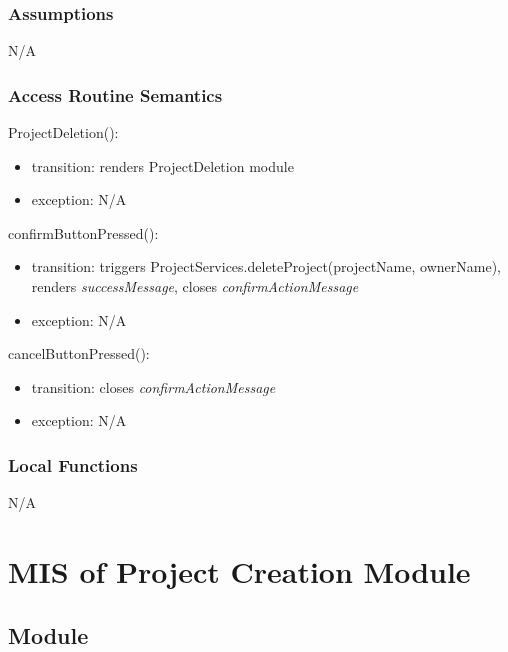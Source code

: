 \documentclass[12pt, titlepage]{article}
\begin{document}
	\subsubsection{Assumptions}
	N/A
	
	\subsubsection{Access Routine Semantics}
	
	\noindent ProjectDeletion():
	\begin{itemize}
		\item transition: renders ProjectDeletion module
		\item exception: N/A
	\end{itemize}
	
	\noindent confirmButtonPressed():
	\begin{itemize}
		\item transition: triggers ProjectServices.deleteProject(projectName, ownerName), renders \textit{successMessage}, closes \textit{confirmActionMessage}
		\item exception: N/A
	\end{itemize}
	
	\noindent cancelButtonPressed():
	\begin{itemize}
		\item transition: closes \textit{confirmActionMessage}
		\item exception: N/A
	\end{itemize}
	
	
	\subsubsection{Local Functions}
	
	N/A
	
	\newpage
	
	\section{MIS of Project Creation Module} \label{Module} 
	
	\subsection{Module}
	
\end{document}
